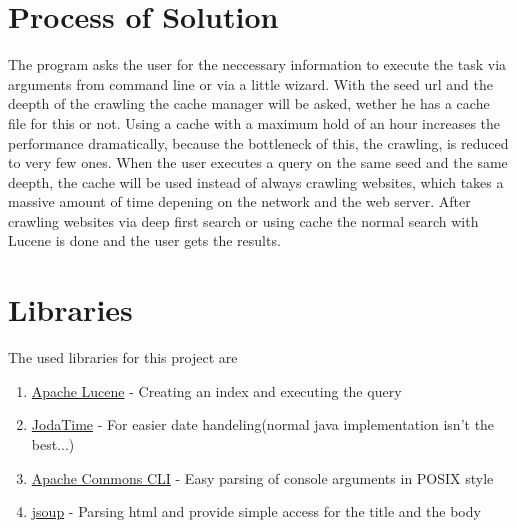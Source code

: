 \documentclass{scrartcl}
\begin{document}
\section{Process of Solution}
The program asks the user for the neccessary information to execute the task via arguments from command line or via a little wizard.
With the seed url and the deepth of the crawling the cache manager will be asked, wether he has a cache file for this or not. Using a cache with a maximum hold of an hour increases the performance dramatically, because the bottleneck of this, the crawling, is reduced to very few ones. When the user executes a query on the same seed and the same deepth, the cache will be used instead of always crawling websites, which takes a massive amount of time depening on the network and the web server.
After crawling websites via deep first search or using cache the normal search with Lucene is done and the user gets the results.

\section{Libraries}
The used libraries for this project are

\begin{enumerate}
	\item \href{http://lucene.apache.org/}{Apache Lucene} - Creating an index and executing the query
	\item \href{http://www.joda.org/joda-time/}{JodaTime} - For easier date handeling(normal java implementation isn't the best...)
	\item \href{http://commons.apache.org/proper/commons-cli/}{Apache Commons CLI} - Easy parsing of console arguments in POSIX style
	\item \href{http://jsoup.org/}{jsoup} - Parsing html and provide simple access for the title and the body

\end{enumerate}
\end{document}
